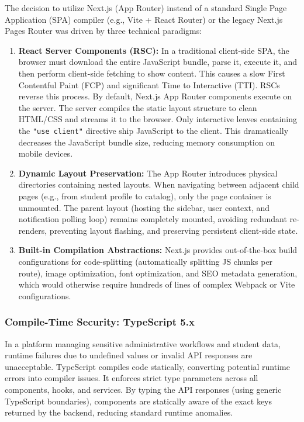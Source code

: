 \documentclass[12pt,a4paper]{article}
\begin{document}
The decision to utilize Next.js (App Router) instead of a standard Single Page Application (SPA) compiler (e.g., Vite + React Router) or the legacy Next.js Pages Router was driven by three technical paradigms:
\begin{enumerate}[leftmargin=2em]
    \item \textbf{React Server Components (RSC):} In a traditional client-side SPA, the browser must download the entire JavaScript bundle, parse it, execute it, and then perform client-side fetching to show content. This causes a slow First Contentful Paint (FCP) and significant Time to Interactive (TTI). RSCs reverse this process. By default, Next.js App Router components execute on the server. The server compiles the static layout structure to clean HTML/CSS and streams it to the browser. Only interactive leaves containing the \texttt{"use client"} directive ship JavaScript to the client. This dramatically decreases the JavaScript bundle size, reducing memory consumption on mobile devices.
    \item \textbf{Dynamic Layout Preservation:} The App Router introduces physical directories containing nested layouts. When navigating between adjacent child pages (e.g., from student profile to catalog), only the page container is unmounted. The parent layout (hosting the sidebar, user context, and notification polling loop) remains completely mounted, avoiding redundant re-renders, preventing layout flashing, and preserving persistent client-side state.
    \item \textbf{Built-in Compilation Abstractions:} Next.js provides out-of-the-box build configurations for code-splitting (automatically splitting JS chunks per route), image optimization, font optimization, and SEO metadata generation, which would otherwise require hundreds of lines of complex Webpack or Vite configurations.
\end{enumerate}

\subsubsection{Compile-Time Security: TypeScript 5.x}

In a platform managing sensitive administrative workflows and student data, runtime failures due to undefined values or invalid API responses are unacceptable. TypeScript compiles code statically, converting potential runtime errors into compiler issues. It enforces strict type parameters across all components, hooks, and services. By typing the API responses (using generic TypeScript boundaries), components are statically aware of the exact keys returned by the backend, reducing standard runtime anomalies.
\end{document}
